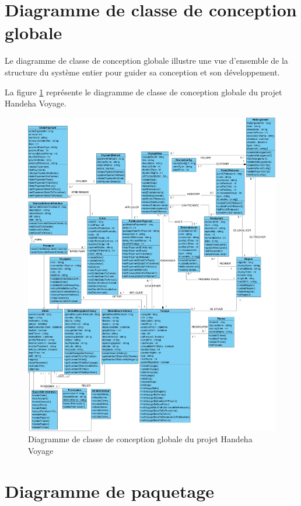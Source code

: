 \documentclass[12pt]{report}
\begin{document}
			\section{Diagramme de classe de conception globale}
			Le diagramme de classe de conception globale illustre une vue d'ensemble de la structure du système entier pour guider sa conception et son développement.
				
			\hspace{15pt} La figure \ref{fig:DCFinal} représente le diagramme de classe de conception globale du projet Handeha Voyage.

			\begin{figure}[h]
				\centering
				\includegraphics[width=\textwidth]{DCFinal.jpg}
				\caption{Diagramme de classe de conception globale du projet Handeha Voyage}
				\label{fig:DCFinal}
			\end{figure}
			\clearpage

	
			\section{Diagramme de paquetage}
\end{document}
